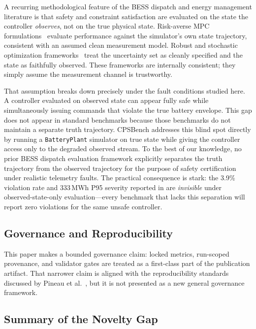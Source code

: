 \documentclass[11pt,a4paper]{article}
\begin{document}
A recurring methodological feature of the BESS dispatch and energy management literature is that safety and constraint satisfaction are evaluated on the state the controller \emph{observes}, not on the true physical state. Risk-averse MPC formulations~\cite{rosewater2020riskaverse} evaluate performance against the simulator's own state trajectory, consistent with an assumed clean measurement model. Robust and stochastic optimization frameworks~\cite{bertsimas2011theory,birge2011stochastic} treat the uncertainty set as cleanly specified and the state as faithfully observed. These frameworks are internally consistent; they simply assume the measurement channel is trustworthy.

That assumption breaks down precisely under the fault conditions studied here. A controller evaluated on observed state can appear fully safe while simultaneously issuing commands that violate the true battery envelope. This gap does not appear in standard benchmarks because those benchmarks do not maintain a separate truth trajectory. CPSBench addresses this blind spot directly by running a \texttt{BatteryPlant} simulator on true state while giving the controller access only to the degraded observed stream. To the best of our knowledge, no prior BESS dispatch evaluation framework explicitly separates the truth trajectory from the observed trajectory for the purpose of safety certification under realistic telemetry faults. The practical consequence is stark: the 3.9\% violation rate and 333\,MWh P95 severity reported in  are \emph{invisible} under observed-state-only evaluation---every benchmark that lacks this separation will report zero violations for the same unsafe controller.

\subsection{Governance and Reproducibility}

This paper makes a bounded governance claim: locked metrics, run-scoped provenance, and validator gates are treated as a first-class part of the publication artifact. That narrower claim is aligned with the reproducibility standards discussed by Pineau et al.~\cite{pineau2021improving}, but it is not presented as a new general governance framework.

\subsection{Summary of the Novelty Gap}
\end{document}
